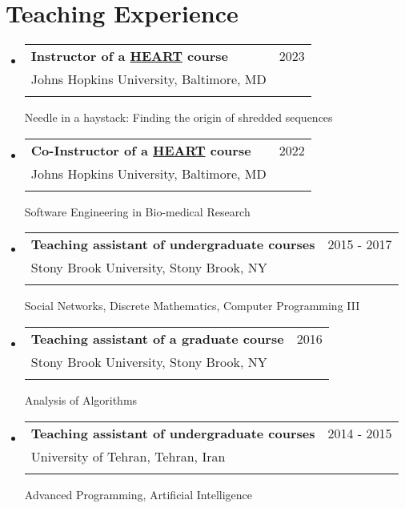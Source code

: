 \documentclass[A4,11pt]{article}
\makeatletter
\newcommand{\CVSubheading}[4]{
  \vspace{-2pt}\item
    \begin{tabular*}{0.97\textwidth}[t]{l@{\extracolsep{\fill}}r}
      \textbf{#1} & #2 \\
      \small#3 & \small #4 \\
    \end{tabular*}\vspace{-7pt}
}
\newcommand{\CVSubHeadingListStart}{\begin{itemize}[leftmargin=0.5cm, label={}]}
\newcommand{\CVSubHeadingListEnd}{\end{itemize}}
\makeatother
\begin{document}
\begin{comment}
Section is here as it applied to my application for positions in academia. 
Remember to tailor the resume for to the position.
\end{comment}

\section{Teaching Experience}
  \CVSubHeadingListStart
  \CVSubheading
  {Instructor of a \href{https://engineering.jhu.edu/education/undergraduate-studies/heart-heroic-courses/}{HEART} course}{2023}
  {Johns Hopkins University, Baltimore, MD}\\
  {Needle in a haystack: Finding the origin of shredded sequences}

  \CVSubheading
  {Co-Instructor of a \href{https://engineering.jhu.edu/education/undergraduate-studies/heart-heroic-courses/}{HEART} course}{2022}
  {Johns Hopkins University, Baltimore, MD}\\
  {Software Engineering in Bio-medical Research}

  \CVSubheading
      {Teaching assistant of undergraduate courses}{2015 - 2017}
      {Stony Brook University, Stony Brook, NY} \\
      {Social Networks, Discrete Mathematics, Computer Programming III}
    \CVSubheading
      {Teaching assistant of a graduate course}{2016}
      {Stony Brook University, Stony Brook, NY}\\
      {Analysis of Algorithms}
    \CVSubheading
      {Teaching assistant of undergraduate courses}{2014 - 2015}
      {University of Tehran, Tehran, Iran}\\
      {Advanced Programming, Artificial Intelligence}
    \CVSubHeadingListEnd
  
%

	\nocite{*}
	
\end{document}
